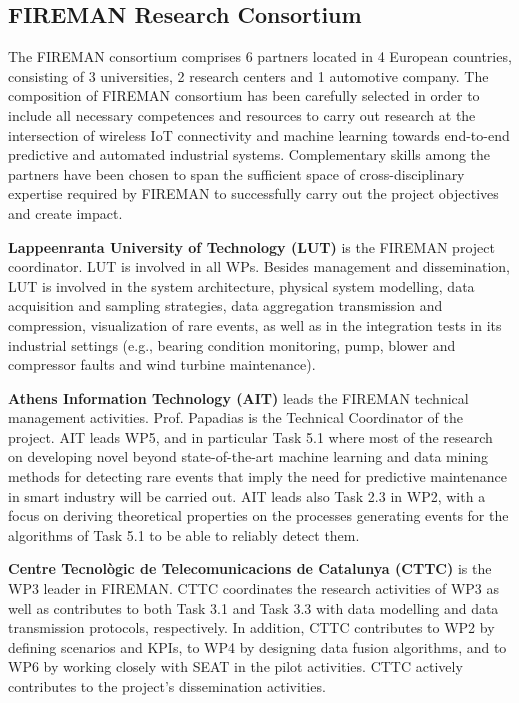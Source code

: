 \subsection{FIREMAN Research Consortium}
The FIREMAN consortium comprises 6 partners located in 4 European countries, consisting of 3 universities, 2 research centers and 1 automotive company. The composition of FIREMAN consortium has been carefully selected in order to include all necessary competences and resources to carry out research at the intersection of wireless IoT connectivity and machine learning towards end-to-end predictive and automated industrial systems. Complementary skills among the partners have been chosen to span the sufficient space of cross-disciplinary expertise required by FIREMAN to successfully carry out the project objectives and create impact.

\textbf{Lappeenranta University of Technology (LUT)} is the FIREMAN project coordinator. LUT is involved in all WPs. Besides management and dissemination, LUT is involved in the system architecture, physical system modelling, data acquisition and sampling strategies, data aggregation transmission and compression, visualization of rare events, as well as in the integration tests in its industrial settings (e.g., bearing condition monitoring, pump, blower and compressor faults and wind turbine maintenance).

\textbf{Athens Information Technology (AIT)} leads the FIREMAN technical management activities. Prof. Papadias is the Technical Coordinator of the project. AIT leads WP5, and in particular Task 5.1 where most of the research on developing novel beyond state-of-the-art machine learning and data mining methods for detecting rare events that imply the need for predictive maintenance in smart industry will be carried out. AIT leads also Task 2.3 in WP2, with a focus on deriving theoretical properties on the processes generating events for the algorithms of Task 5.1 to be able to reliably detect them.

\textbf{Centre Tecnològic de Telecomunicacions de Catalunya (CTTC)} is the WP3 leader in FIREMAN. CTTC coordinates the research activities of WP3 as well as contributes to both Task 3.1 and Task 3.3 with data modelling and data transmission protocols, respectively. In addition, CTTC contributes to WP2 by defining scenarios and KPIs, to WP4 by designing data fusion algorithms, and to WP6 by working closely with SEAT in the pilot activities. CTTC actively contributes to the project’s dissemination activities. 

